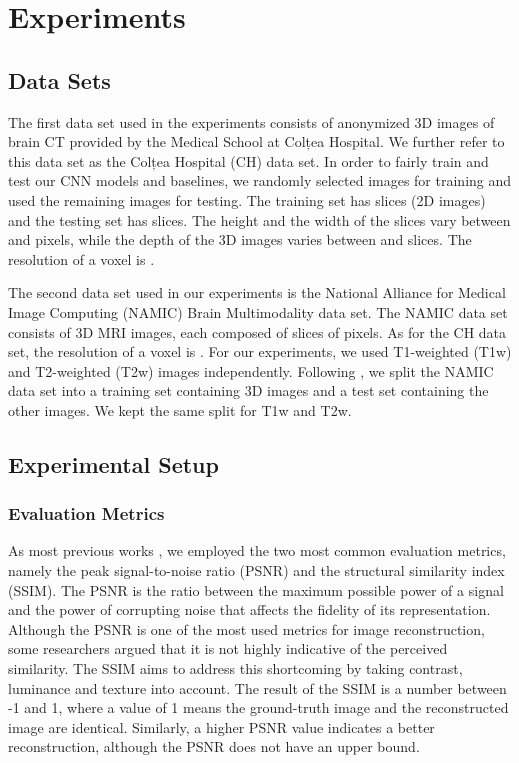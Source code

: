 \documentclass{ieeeaccess}
\begin{document}
\section{Experiments}
\label{sec_Experiments}

\subsection{Data Sets}

The first data set used in the experiments consists of  anonymized 3D images of brain CT provided by the Medical School at Colțea Hospital. We further refer to this data set as the Colțea Hospital (CH) data set. In order to fairly train and test our CNN models and baselines, we randomly selected  images for training and used the remaining  images for testing. The training set has  slices (2D images) and the testing set has  slices. The height and the width of the slices vary between  and  pixels, while the depth of the 3D images varies between  and  slices. The resolution of a voxel is .

The second data set used in our experiments is the National Alliance for Medical Image Computing (NAMIC) Brain Multimodality data set. The NAMIC data set consists of  3D MRI images, each composed of  slices of  pixels. As for the CH data set, the resolution of a voxel is . For our experiments, we used T1-weighted (T1w) and T2-weighted (T2w) images independently. Following \cite{Pham-CMIG-2019}, we split the NAMIC data set into a training set containing  3D images and a test set containing the other  images. We kept the same split for T1w and T2w.

\subsection{Experimental Setup}

\subsubsection{Evaluation Metrics}

As most previous works \cite{ Du-AS-2019,  Du-NC-2019,  Li-Access-2019, Oktay-MICCAI-2016, Pham-CMIG-2019, Shi-JBHI-2018, You-TMI-2019, Yu-ICIP-2017, ZENG-CBM-2018, Zhao-TMI-2019}, we employed the two most common evaluation metrics, namely the peak signal-to-noise ratio (PSNR) and the structural similarity index (SSIM). The PSNR is the ratio between the maximum possible power of a signal and the power of corrupting noise that affects the fidelity of its representation. Although the PSNR is one of the most used metrics for image reconstruction, some researchers \cite{Wang-TIP-2004,Wang-SPM-2009} argued that it is not highly indicative of the perceived similarity. The SSIM \cite{Wang-TIP-2004} aims to address this shortcoming by taking contrast, luminance and texture into account. The result of the SSIM is a number between -1 and 1, where a value of 1 means the ground-truth image and the reconstructed image are identical. Similarly, a higher PSNR value indicates a better reconstruction, although the PSNR does not have an upper bound.
\end{document}
